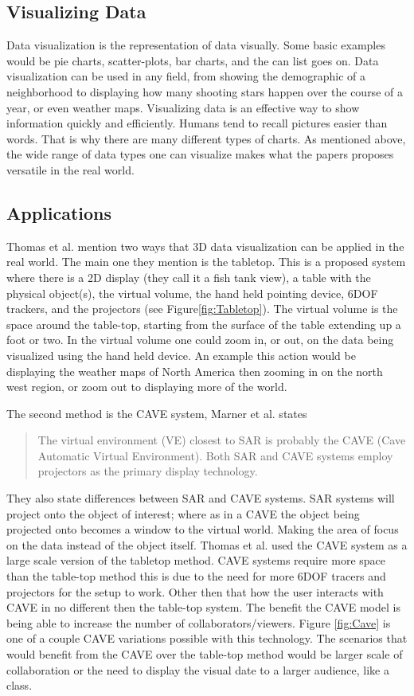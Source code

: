 \documentclass{sig-alternate}
\begin{document}
\subsection{Visualizing Data}
\label{sec:Visualizing Data}
Data visualization is the representation of data visually. Some basic examples would be pie charts, scatter-plots, bar charts, and the can list goes on. Data visualization can be used in any field, from showing the demographic of a neighborhood to displaying how many shooting stars happen over the course of a year, or even weather maps. Visualizing data is an effective way to show information quickly and efficiently. Humans tend to recall pictures easier than words. That is why there are many different types of charts. As mentioned above, the wide range of data types one can visualize makes what the papers proposes versatile in the real world.       

\subsection{Applications}
\label{sec:3D Applications}
Thomas et al. mention two ways that 3D data visualization can be applied in the real world. The main one they mention is the tabletop. This is a proposed system where there is a 2D display (they call it a fish tank view), a table with the physical object(s), the virtual volume, the hand held pointing device, 6DOF trackers, and the projectors (see Figure\ref{fig:Tabletop}). The virtual volume is the space around the table-top, starting from the surface of the table extending up a foot or two. In the virtual volume one could zoom in, or out, on the data being visualized using the hand held device. An example this action would be displaying the weather maps of North America then zooming in on the north west region, or zoom out to displaying more of the world.  

The second method is the CAVE system, Marner et al. states
\begin{quote}
	The virtual environment (VE) closest to SAR is probably the CAVE (Cave Automatic Virtual Environment). Both SAR and CAVE systems employ projectors as the primary display technology. \cite{CAVE}
\end{quote}
They also state differences between SAR and CAVE systems. SAR systems will project onto the object of interest; where as in a CAVE the object being projected onto becomes a window to the virtual world. Making the area of focus on the data instead of the object itself. Thomas et al. used the CAVE system as a large scale version of the tabletop method. CAVE systems require more space than the table-top method this is due to the need for more 6DOF tracers and projectors for the setup to work. Other then that how the user interacts with CAVE in no different then the table-top system. The benefit the CAVE model is being able to increase the number of collaborators/viewers. Figure \ref{fig:Cave} is one of a couple CAVE variations possible with this technology. The scenarios that would benefit from the CAVE over the table-top method would be larger scale of collaboration or the need to display the visual date to a larger audience, like a class. 
\end{document}
